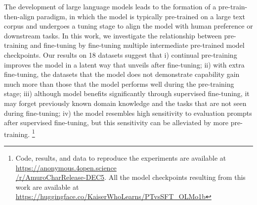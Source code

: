 
The development of large language models leads to the formation of a pre-train-then-align paradigm, in which the model is typically pre-trained on a large text corpus and undergoes a tuning stage to align the model with human preference or downstream tasks.
In this work, we investigate the relationship between pre-training and fine-tuning by fine-tuning multiple intermediate pre-trained model checkpoints. Our results on 18 datasets suggest that i) continual pre-training improves the model in a latent way that unveils after fine-tuning; ii) with extra fine-tuning, the datasets that the model does not demonstrate capability gain much more than those that the model performs well during the pre-training stage; iii) although model benefits significantly through supervised fine-tuning, it may forget previously known domain knowledge and the tasks that are not seen during fine-tuning; iv) the model resembles high sensitivity to evaluation prompts after supervised fine-tuning, but this sensitivity can be alleviated by more pre-training.
\footnote{Code, results, and data to reproduce the experiments are available at \href{https://anonymous.4open.science/r/AmuroCharRelease-DEC5}{https://anonymous.4open.science\\/r/AmuroCharRelease-DEC5}. All the model checkpoints resulting from this work are available at \href{https://huggingface.co/KaiserWhoLearns/PTvsSFT_OLMo1b}{https://huggingface.co/KaiserWhoLearns/PTvsSFT\_OLMo1b}}